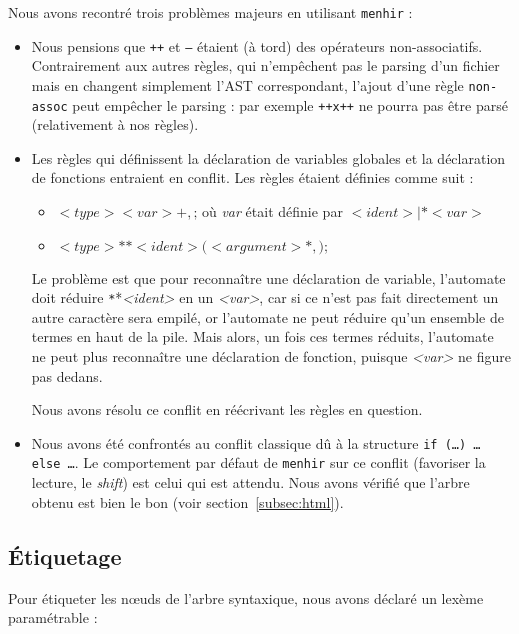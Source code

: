\documentclass[a4paper]{article}
\begin{document}
Nous avons recontré trois problèmes majeurs en utilisant \texttt{menhir} :
\begin{itemize}
    \item Nous pensions que \texttt{++} et \texttt{--} étaient (à tord) des
    opérateurs non-associatifs. Contrairement aux autres règles, qui
    n'empêchent pas le parsing d'un fichier mais en changent simplement
    l'AST correspondant, l'ajout d'une règle \texttt{non-assoc} peut
    empêcher le parsing : par exemple \texttt{++x++} ne pourra pas être
    parsé (relativement à nos règles).
    \item Les règles qui définissent la déclaration de variables globales et la déclaration de fonctions entraient en conflit.
          Les règles étaient définies comme suit :
          \begin{itemize}
              \item $<type> <var>+,\texttt{;}$ où \emph{var} était définie par $<ident> | \texttt{*} <var>$
              \item $<type> \texttt{*}* <ident>\texttt{(} <argument>*, \texttt{);}$
          \end{itemize}
          Le problème est que pour reconnaître une déclaration de variable, l'automate doit réduire \texttt{*}*\emph{<ident>} en un \emph{<var>}, car si ce n'est pas fait directement un autre caractère sera empilé, or l'automate ne peut réduire qu'un ensemble de termes en haut de la pile. Mais alors, un fois ces termes réduits, l'automate ne peut plus reconnaître une déclaration de fonction, puisque \emph{<var>} ne figure pas dedans.

          Nous avons résolu ce conflit en réécrivant les règles en question.

      \item Nous avons été confrontés au conflit classique dû à la structure \texttt{if (…) … else …}.
            Le comportement par défaut de \texttt{menhir} sur ce conflit (favoriser la lecture, le \emph{shift}) est celui qui est attendu. Nous avons vérifié que l'arbre obtenu est bien le bon (voir section~\ref{subsec:html}).

\end{itemize}

\subsection{Étiquetage}

Pour étiqueter les nœuds de l'arbre syntaxique, nous avons déclaré un lexème paramétrable :
\end{document}
